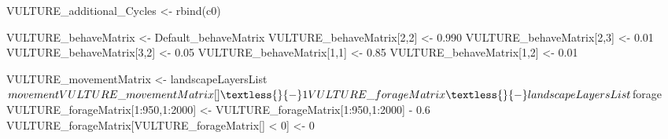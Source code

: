 \documentclass[10pt,a4paper]{article}
\newenvironment{Shaded}{}{}
\newcommand{\DecValTok}[1]{#1}
\newcommand{\FloatTok}[1]{#1}
\newcommand{\FunctionTok}[1]{#1}
\newcommand{\NormalTok}[1]{#1}
\newcommand{\OtherTok}[1]{#1}
\newcommand{\SpecialCharTok}[1]{#1}
\begin{document}
\begin{Shaded}
\begin{Highlighting}[]
\NormalTok{VULTURE\_additional\_Cycles }\OtherTok{\textless{}{-}} \FunctionTok{rbind}\NormalTok{(c0)}

\NormalTok{VULTURE\_behaveMatrix }\OtherTok{\textless{}{-}}\NormalTok{ Default\_behaveMatrix}
\NormalTok{VULTURE\_behaveMatrix[}\DecValTok{2}\NormalTok{,}\DecValTok{2}\NormalTok{] }\OtherTok{\textless{}{-}} \FloatTok{0.990}
\NormalTok{VULTURE\_behaveMatrix[}\DecValTok{2}\NormalTok{,}\DecValTok{3}\NormalTok{] }\OtherTok{\textless{}{-}} \FloatTok{0.01}
\NormalTok{VULTURE\_behaveMatrix[}\DecValTok{3}\NormalTok{,}\DecValTok{2}\NormalTok{] }\OtherTok{\textless{}{-}} \FloatTok{0.05}
\NormalTok{VULTURE\_behaveMatrix[}\DecValTok{1}\NormalTok{,}\DecValTok{1}\NormalTok{] }\OtherTok{\textless{}{-}} \FloatTok{0.85}
\NormalTok{VULTURE\_behaveMatrix[}\DecValTok{1}\NormalTok{,}\DecValTok{2}\NormalTok{] }\OtherTok{\textless{}{-}} \FloatTok{0.01}


\NormalTok{VULTURE\_movementMatrix }\OtherTok{\textless{}{-}}\NormalTok{ landscapeLayersList}\SpecialCharTok{$}\NormalTok{movement}
\NormalTok{VULTURE\_movementMatrix[] }\OtherTok{\textless{}{-}} \DecValTok{1}


\NormalTok{VULTURE\_forageMatrix }\OtherTok{\textless{}{-}}\NormalTok{ landscapeLayersList}\SpecialCharTok{$}\NormalTok{forage}
\NormalTok{VULTURE\_forageMatrix[}\DecValTok{1}\SpecialCharTok{:}\DecValTok{950}\NormalTok{,}\DecValTok{1}\SpecialCharTok{:}\DecValTok{2000}\NormalTok{] }\OtherTok{\textless{}{-}}\NormalTok{ VULTURE\_forageMatrix[}\DecValTok{1}\SpecialCharTok{:}\DecValTok{950}\NormalTok{,}\DecValTok{1}\SpecialCharTok{:}\DecValTok{2000}\NormalTok{] }\SpecialCharTok{{-}} \FloatTok{0.6}
\NormalTok{VULTURE\_forageMatrix[VULTURE\_forageMatrix[] }\SpecialCharTok{\textless{}} \DecValTok{0}\NormalTok{] }\OtherTok{\textless{}{-}} \DecValTok{0}
\end{Highlighting}
\end{Shaded}
\end{document}

